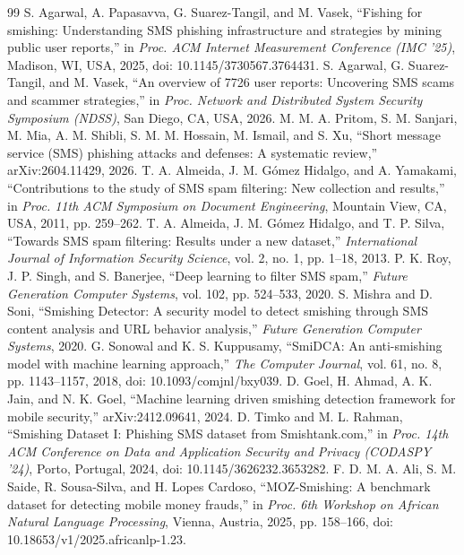 \clearpage
\renewcommand{\bibname}{References}
\begin{thebibliography}{99}\small
{} S. Agarwal, A. Papasavva, G. Suarez-Tangil, and M. Vasek, ``Fishing for smishing: Understanding SMS phishing infrastructure and strategies by mining public user reports,'' in \textit{Proc. ACM Internet Measurement Conference (IMC '25)}, Madison, WI, USA, 2025, doi: 10.1145/3730567.3764431.
 S. Agarwal, G. Suarez-Tangil, and M. Vasek, ``An overview of 7726 user reports: Uncovering SMS scams and scammer strategies,'' in \textit{Proc. Network and Distributed System Security Symposium (NDSS)}, San Diego, CA, USA, 2026.
 M. M. A. Pritom, S. M. Sanjari, M. Mia, A. M. Shibli, S. M. M. Hossain, M. Ismail, and S. Xu, ``Short message service (SMS) phishing attacks and defenses: A systematic review,'' arXiv:2604.11429, 2026.
 T. A. Almeida, J. M. G\'omez Hidalgo, and A. Yamakami, ``Contributions to the study of SMS spam filtering: New collection and results,'' in \textit{Proc. 11th ACM Symposium on Document Engineering}, Mountain View, CA, USA, 2011, pp. 259--262.
 T. A. Almeida, J. M. G\'omez Hidalgo, and T. P. Silva, ``Towards SMS spam filtering: Results under a new dataset,'' \textit{International Journal of Information Security Science}, vol. 2, no. 1, pp. 1--18, 2013.
 P. K. Roy, J. P. Singh, and S. Banerjee, ``Deep learning to filter SMS spam,'' \textit{Future Generation Computer Systems}, vol. 102, pp. 524--533, 2020.
 S. Mishra and D. Soni, ``Smishing Detector: A security model to detect smishing through SMS content analysis and URL behavior analysis,'' \textit{Future Generation Computer Systems}, 2020.
 G. Sonowal and K. S. Kuppusamy, ``SmiDCA: An anti-smishing model with machine learning approach,'' \textit{The Computer Journal}, vol. 61, no. 8, pp. 1143--1157, 2018, doi: 10.1093/comjnl/bxy039.
 D. Goel, H. Ahmad, A. K. Jain, and N. K. Goel, ``Machine learning driven smishing detection framework for mobile security,'' arXiv:2412.09641, 2024.
 D. Timko and M. L. Rahman, ``Smishing Dataset I: Phishing SMS dataset from Smishtank.com,'' in \textit{Proc. 14th ACM Conference on Data and Application Security and Privacy (CODASPY '24)}, Porto, Portugal, 2024, doi: 10.1145/3626232.3653282.
 F. D. M. A. Ali, S. M. Saide, R. Sousa-Silva, and H. Lopes Cardoso, ``MOZ-Smishing: A benchmark dataset for detecting mobile money frauds,'' in \textit{Proc. 6th Workshop on African Natural Language Processing}, Vienna, Austria, 2025, pp. 158--166, doi: 10.18653/v1/2025.africanlp-1.23.

\end{thebibliography}
